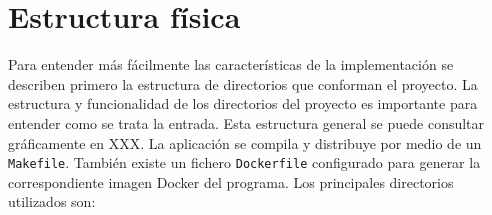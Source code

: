 





\section{Estructura física}

Para entender más fácilmente las características de la implementación se describen primero la estructura de directorios que conforman el proyecto. 
La estructura y funcionalidad de los directorios del proyecto es importante para entender como se trata la entrada. Esta estructura general se puede consultar gráficamente en XXX. La aplicación se compila y distribuye por medio de un \verb|Makefile|. También existe un fichero \verb|Dockerfile| configurado para generar la correspondiente imagen Docker del programa. Los principales directorios utilizados son:

